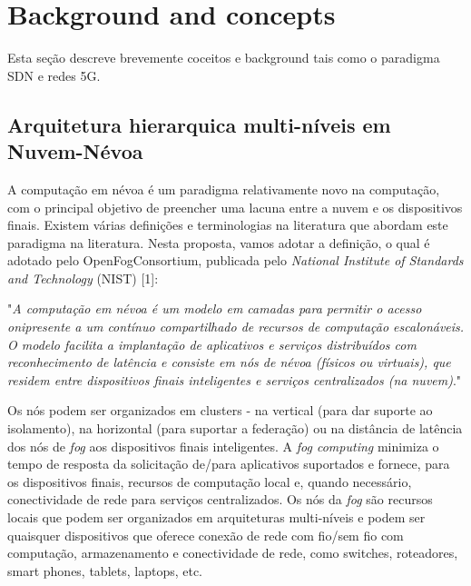 \clearpage
\section{Background and concepts}
\label{ch:background}

Esta seção descreve brevemente coceitos e background tais como o paradigma SDN e redes 5G.

\subsection{Arquitetura hierarquica multi-níveis em Nuvem-Névoa}

A computação em névoa é um paradigma relativamente novo na computação, com o principal objetivo de preencher uma lacuna entre a nuvem e os dispositivos finais. Existem várias definições e terminologias na literatura que abordam este paradigma na literatura. Nesta proposta, vamos adotar a definição, o qual é adotado pelo OpenFogConsortium, publicada pelo \textit{National Institute of Standards and Technology} (NIST) [1]: 

\begin{displayquote}

 "\textit{A computação em névoa é um modelo em camadas para permitir o acesso onipresente a um contínuo compartilhado de recursos de computação escalonáveis. O modelo facilita a implantação de aplicativos e serviços distribuídos com reconhecimento de latência e consiste em nós de névoa (físicos ou virtuais), que residem entre dispositivos finais inteligentes e serviços centralizados (na nuvem)}."

\end{displayquote}

Os nós podem ser organizados em clusters - na vertical (para dar suporte ao isolamento), na horizontal (para suportar a federação) ou na distância de latência dos nós de \textit{fog} aos dispositivos finais inteligentes. A \textit{fog computing} minimiza o tempo de resposta da solicitação de/para aplicativos suportados e fornece, para os dispositivos finais, recursos de computação local e, quando necessário, conectividade de rede para serviços centralizados. Os nós da \textit{fog} são recursos locais que podem ser organizados em arquiteturas multi-níveis e podem ser quaisquer dispositivos que oferece conexão de rede com fio/sem fio com computação, armazenamento e conectividade de rede, como switches, roteadores, smart phones, tablets, laptops, etc. 

